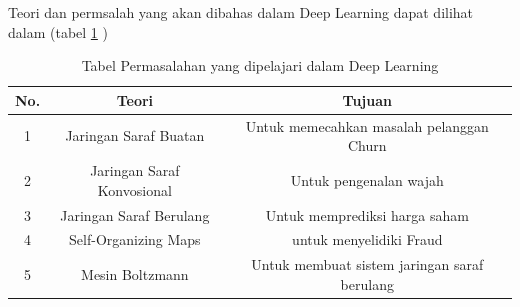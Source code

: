 Teori dan permsalah yang akan dibahas dalam Deep Learning dapat dilihat dalam (tabel \ref{Permasalahan Deep Learning} )
\begin{table}[H]

\centering
\begin{tabular}{|c|c|c|}
\hline
No. & Teori & Tujuan\\
\hline
1   & Jaringan Saraf Buatan & Untuk memecahkan masalah pelanggan Churn\\
2   & Jaringan Saraf Konvosional & Untuk pengenalan wajah \\
3   & Jaringan Saraf Berulang & Untuk memprediksi harga saham\\
4   & Self-Organizing Maps & untuk menyelidiki Fraud\\
5   & Mesin Boltzmann & Untuk membuat sistem jaringan saraf berulang\\
\hline
\end{tabular}
\caption {Tabel Permasalahan yang dipelajari dalam Deep Learning}
\label{Permasalahan Deep Learning}
\end{table}





